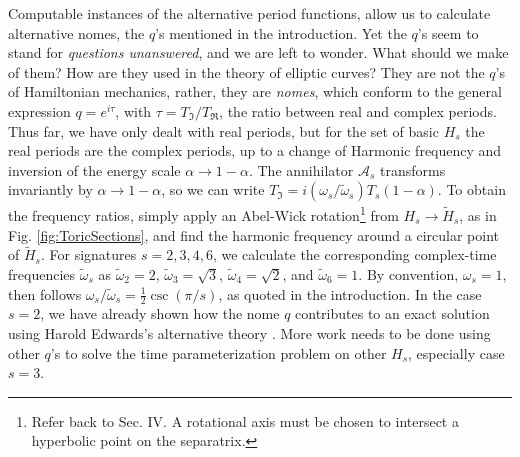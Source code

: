 \documentclass[nofootinbib,preprint]{revtex4-1}
\begin{document}
Computable instances of the alternative period functions, allow us to calculate
alternative nomes, the $q$'s mentioned in the introduction. Yet the $q$'s seem to 
stand for \textit{questions unanswered}, and 
we are left to wonder. What should we make of them? How are they used in the theory of 
elliptic curves? They are not the $q$'s of Hamiltonian mechanics, rather, they are \textit{nomes}, 
which conform to the general expression $q=e^{i \tau}$, with 
$\tau = T_{\mathfrak{I}}/T_{\mathfrak{R}}$,
the ratio between real and complex periods. Thus far, we have only dealt with 
real periods, but for the set of basic $H_s$ the real periods are the complex periods,
up to a change of Harmonic frequency and inversion of the energy scale $\alpha \rightarrow 1-\alpha$. 
The annihilator $\mathcal{A}_s$ transforms invariantly by $\alpha \rightarrow 1- \alpha$, so we 
can write $T_{\mathfrak{I}}=i(\omega_s/\widetilde{\omega}_s)T_s(1-\alpha)$. To obtain the frequency ratios, 
simply apply an Abel-Wick rotation\footnote{Refer back to \cite{KLEE2020Pendulum} Sec. IV. A rotational axis must be chosen to 
intersect a hyperbolic point on the separatrix.} from $H_s \rightarrow \widetilde{H}_s$,
as in Fig. \ref{fig:ToricSections}, and find the harmonic frequency around a circular point of $\widetilde{H}_s$. 
For signatures $s=2,3,4,6$, we calculate the corresponding complex-time frequencies $\widetilde{\omega}_s$ as 
$\widetilde{\omega}_2 = 2$, $\widetilde{\omega}_3 = \sqrt{3}$, $\widetilde{\omega}_4 = \sqrt{2}$, 
and $\widetilde{\omega}_6=1$. By convention, $\omega_s = 1$, then follows 
$\omega_s/\widetilde{\omega}_s = \frac{1}{2}\csc(\pi/s)$, as quoted in the introduction. 
In the case $s=2$, we have already shown how the nome $q$ contributes to an exact solution
using Harold Edwards's alternative theory \cite{EDWARDS2007}. More work needs to be done 
using other $q$'s to solve the time parameterization problem on other $H_s$, especially case $s=3$.

\pagebreak 
\end{document}
